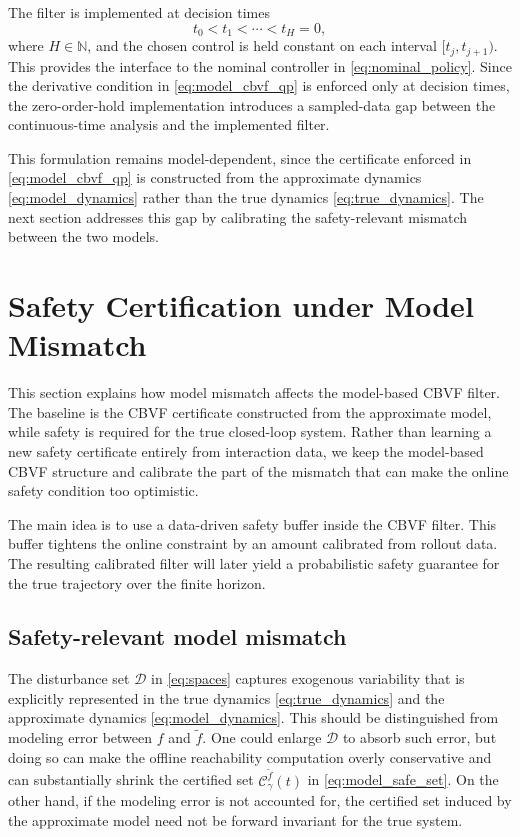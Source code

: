 \documentclass[letterpaper,10pt,conference]{ieeeconf}
\newcommand{\N}{\mathbb{N}}
\newcommand{\fapp}{\widetilde{f}}
\newcommand{\Dv}{\mathcal{D}}
\begin{document}
The filter is implemented at decision times
\begin{equation}
    t_0<t_1<\cdots<t_H=0,
    \label{eq:decision_times}
\end{equation}
where $H\in\N$, and the chosen control is held constant on each interval
$[t_j,t_{j+1})$. This provides the interface to the nominal controller in
\eqref{eq:nominal_policy}. Since the derivative condition in
\eqref{eq:model_cbvf_qp} is enforced only at decision times, the zero-order-hold
implementation introduces a sampled-data gap between the continuous-time
analysis and the implemented filter.

This formulation remains model-dependent, since the certificate enforced in
\eqref{eq:model_cbvf_qp} is constructed from the approximate dynamics
\eqref{eq:model_dynamics} rather than the true dynamics
\eqref{eq:true_dynamics}. The next section addresses this gap by calibrating
the safety-relevant mismatch between the two models.




\section{Safety Certification under Model Mismatch}

This section explains how model mismatch affects the model-based CBVF filter.
The baseline is the CBVF certificate constructed from the approximate model,
while safety is required for the true closed-loop system. Rather than learning a
new safety certificate entirely from interaction data, we keep the model-based
CBVF structure and calibrate the part of the mismatch that can make the online
safety condition too optimistic.

The main idea is to use a data-driven safety buffer inside the CBVF filter. This
buffer tightens the online constraint by an amount calibrated from rollout data.
The resulting calibrated filter will later yield a probabilistic safety
guarantee for the true trajectory over the finite horizon.

\subsection{Safety-relevant model mismatch}

The disturbance set $\Dv$ in \eqref{eq:spaces} captures exogenous variability
that is explicitly represented in the true dynamics \eqref{eq:true_dynamics}
and the approximate dynamics \eqref{eq:model_dynamics}. This should be
distinguished from modeling error between $f$ and $\fapp$. One could enlarge
$\Dv$ to absorb such error, but doing so can make the offline reachability
computation overly conservative and can substantially shrink the certified set
$\mathcal{C}_{\gamma}^{\tilde f}(t)$ in \eqref{eq:model_safe_set}. On the other
hand, if the modeling error is not accounted for, the certified set induced by
the approximate model need not be forward invariant for the true system.
\end{document}
